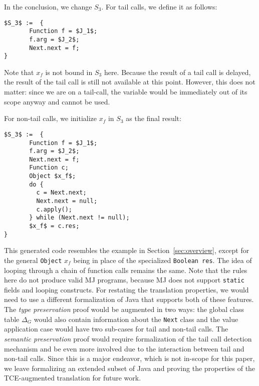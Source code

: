 {\small
  \ea
 \eda
}

In the conclusion, we change $S_3$. For tail calls, we define it as follows:

\begin{lstlisting}[mathescape]
$S_3$ :=  {
       Function f = $J_1$;
       f.arg = $J_2$;
       Next.next = f;
}
\end{lstlisting}

Note that $x_f$ is not bound in $S_3$ here. Because the result of a
tail call is delayed, the result of the tail call is still not
available at this point.  However, this does not matter: since we are
on a tail-call, the variable would be immediately out of its scope
anyway and cannot be used.

For non-tail calls, we initialize $x_f$ in $S_3$ as the final result:

\begin{lstlisting}[mathescape]
$S_3$ :=  {
       Function f = $J_1$;
       f.arg = $J_2$;
       Next.next = f;
       Function c;
       Object $x_f$;
       do {
         c = Next.next;
         Next.next = null;
         c.apply();
       } while (Next.next != null);
       $x_f$ = c.res;
}
\end{lstlisting}

This generated code resembles the example in
Section~\ref{sec:overview}, except for the general \lstinline{Object}
$x_f$ being in place of the specialized \lstinline{Boolean res}. The
idea of looping through a chain of function calls remains the same.
Note that the rules here do not produce valid MJ programs, because MJ does not support
\lstinline{static} fields and looping constructs. For restating the translation properties,
we would need to use a different formalization of Java that supports both of these features.
The \emph{type preservation} proof would be augmented in two ways: the global class table
$\Delta_G$ would also contain information about the \lstinline{Next} class and 
the value application case would have two sub-cases for tail and non-tail calls.
The \emph{semantic preservation} proof would require formalization of the tail call
detection mechanism and be even more involved due to the interaction between
tail and non-tail calls. Since this is a major endeavor, which is not in-scope
for this paper, we leave formalizing an extended subset of Java and 
proving the properties of the TCE-augmented translation for future work.
